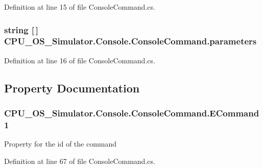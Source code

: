 Definition at line 15 of file Console\+Command.\+cs.

\hypertarget{class_c_p_u___o_s___simulator_1_1_console_1_1_console_command_a00586d96461c740fd20069c604424c22}{}
\subsubsection[{parameters}]{\setlength{\rightskip}{0pt plus 5cm}string \mbox{[}$\,$\mbox{]} C\+P\+U\+\_\+\+O\+S\+\_\+\+Simulator.\+Console.\+Console\+Command.\+parameters\hspace{0.3cm}{\ttfamily [private]}}\label{class_c_p_u___o_s___simulator_1_1_console_1_1_console_command_a00586d96461c740fd20069c604424c22}


Definition at line 16 of file Console\+Command.\+cs.



\subsection{Property Documentation}
\hypertarget{class_c_p_u___o_s___simulator_1_1_console_1_1_console_command_ae96cab2ae94ba9ee4a18130e7c8f2866}{}
\subsubsection[{E\+Command1}]{ C\+P\+U\+\_\+\+O\+S\+\_\+\+Simulator.\+Console.\+Console\+Command.\+E\+Command1\hspace{0.3cm}{\ttfamily [get]}}\label{class_c_p_u___o_s___simulator_1_1_console_1_1_console_command_ae96cab2ae94ba9ee4a18130e7c8f2866}


Property for the id of the command 



Definition at line 67 of file Console\+Command.\+cs.

